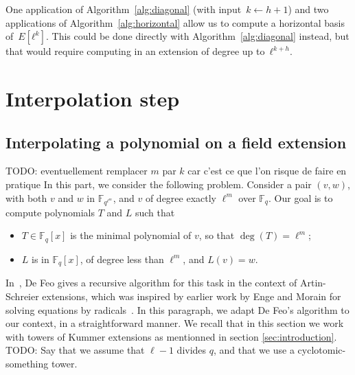 \documentclass{lms}
\newcommand{\todo}[1]{{\color{red}TODO: #1}}
\newcommand{\F}{\mathbb{F}}
\begin{document}
% 
One application of Algorithm~\ref{alg:diagonal} (with input~$k ← h+1$)
and two applications of Algorithm~\ref{alg:horizontal} allow us
to compute a horizontal basis of~$E[ℓ^k]$.
This could be done directly with Algorithm~\ref{alg:diagonal} instead,
but that would require computing in an extension
of degree up to~$ℓ^{k+h}$.




\section{Interpolation step}
\label{sec:interpolation}
\subsection{Interpolating a polynomial on a field extension}
\todo{eventuellement remplacer $m$ par $k$ car c'est ce que l'on risque de faire en pratique}
In this part, we consider the following problem. Consider a pair $(v,
w)$, with both $v$ and $w$ in $\F_{q^{\ell^m}}$, and $v$ of degree exactly
$\ell^m$ over $\F_q$. Our goal is to
compute polynomials $T$ and $L$ such that
\begin{itemize}
\item $T \in \F_q[x]$ is the minimal polynomial of $v$, so that $\deg(T) = \ell^m$;
\item $L$ is in $\F_q[x]$, of degree less than $\ell^m$, and $L(v)=w$.
\end{itemize}
In~\cite{df10}, De Feo gives a recursive algorithm for this task in the
context of Artin-Schreier extensions, which was inspired by earlier
work by Enge and Morain for solving equations by radicals~\cite{enge+morain03}.
In this paragraph, we adapt De Feo's algorithm to our context, in a straightforward manner. 
We recall that in this section we work with towers of Kummer extensions as mentionned in section \ref{sec:introduction}.
\todo{Say that we assume that $\ell-1$ divides $q$, and that we
use a cyclotomic-something tower.}
\end{document}
